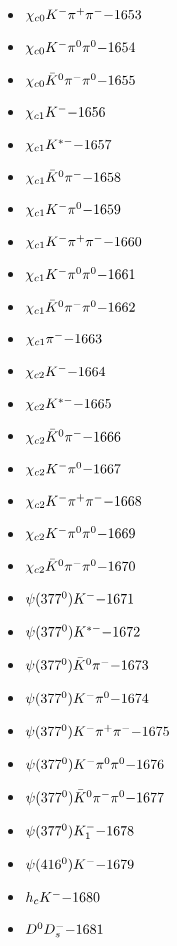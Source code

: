 \begin{multicols}{3}
\begin{itemize}
 \item $ \chi_{c0} K^{-} \pi^{+} \pi^{-} \hfill{-1653}$
 \item $ \chi_{c0} K^{-} \pi^{0} \pi^{0} \hfill{-1654}$
 \item $ \chi_{c0} \bar{K}^{0} \pi^{-} \pi^{0} \hfill{-1655}$
 \item $ \chi_{c1} K^{-} \hfill{-1656}$
 \item $ \chi_{c1} K^{*-} \hfill{-1657}$
 \item $ \chi_{c1} \bar{K}^{0} \pi^{-} \hfill{-1658}$
 \item $ \chi_{c1} K^{-} \pi^{0} \hfill{-1659}$
 \item $ \chi_{c1} K^{-} \pi^{+} \pi^{-} \hfill{-1660}$
 \item $ \chi_{c1} K^{-} \pi^{0} \pi^{0} \hfill{-1661}$
 \item $ \chi_{c1} \bar{K}^{0} \pi^{-} \pi^{0} \hfill{-1662}$
 \item $ \chi_{c1} \pi^{-} \hfill{-1663}$
 \item $ \chi_{c2} K^{-} \hfill{-1664}$
 \item $ \chi_{c2} K^{*-} \hfill{-1665}$
 \item $ \chi_{c2} \bar{K}^{0} \pi^{-} \hfill{-1666}$
 \item $ \chi_{c2} K^{-} \pi^{0} \hfill{-1667}$
 \item $ \chi_{c2} K^{-} \pi^{+} \pi^{-} \hfill{-1668}$
 \item $ \chi_{c2} K^{-} \pi^{0} \pi^{0} \hfill{-1669}$
 \item $ \chi_{c2} \bar{K}^{0} \pi^{-} \pi^{0} \hfill{-1670}$
 \item $ \psi(377^{0}) K^{-} \hfill{-1671}$
 \item $ \psi(377^{0}) K^{*-} \hfill{-1672}$
 \item $ \psi(377^{0}) \bar{K}^{0} \pi^{-} \hfill{-1673}$
 \item $ \psi(377^{0}) K^{-} \pi^{0} \hfill{-1674}$
 \item $ \psi(377^{0}) K^{-} \pi^{+} \pi^{-} \hfill{-1675}$
 \item $ \psi(377^{0}) K^{-} \pi^{0} \pi^{0} \hfill{-1676}$
 \item $ \psi(377^{0}) \bar{K}^{0} \pi^{-} \pi^{0} \hfill{-1677}$
 \item $ \psi(377^{0}) K_{1}^{-} \hfill{-1678}$
 \item $ \psi(416^{0}) K^{-} \hfill{-1679}$
 \item $ h_{c} K^{-} \hfill{-1680}$
 \item $ D^{0} D_{s}^{-} \hfill{-1681}$

\end{itemize}
\end{multicols}
